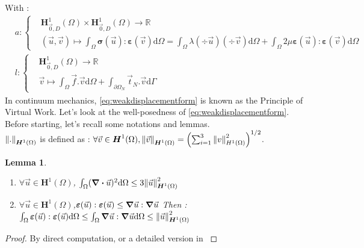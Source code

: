 \documentclass[a4paper,12pt,twoside]{report}
\newcommand{\mtr}{\mathbb{R}}
\newcommand{\dif}{\mathrm{d}}
\newtheorem{lemma}[theorem]{Lemma}
\begin{document}
With : 
\begin{equation*}
    \begin{aligned}
        & a : \left\{
        \begin{aligned}
            &\boldsymbol H^1_{\vec 0,D}(\Omega) \times \boldsymbol H^1_{\vec 0,D}(\Omega)  \rightarrow \mtr \\
            &(\vec u,\vec v)  \longmapsto \int_\Omega \boldsymbol \sigma(\vec u) : \boldsymbol \varepsilon (\vec v) \dif \Omega = \int_\Omega \lambda (\div \vec u) (\div \vec v) \dif \Omega+ \int_\Omega 2\mu \boldsymbol \varepsilon(\vec u): \boldsymbol \varepsilon (\vec v)\dif \Omega
        \end{aligned}
        \right. \\
    	& l : \left\{
        \begin{aligned}
            &\boldsymbol H^1_{\vec 0,D}(\Omega) \rightarrow \mtr \\
            &\vec v \longmapsto \int_\Omega \vec f . \vec v \dif \Omega + \int_{\partial\Omega_N} \vec t_N.\vec v \dif \Gamma
        \end{aligned}
        \right.
    \end{aligned}
\end{equation*}
In continuum mechanics, \eqref{eq:weakdisplacementform} is known as the Principle of Virtual Work. Let's look at the well-posedness of \eqref{eq:weakdisplacementform}. Before starting, let's recall some notations and lemmas. \\

$\norm{.}_{\boldsymbol H^1(\Omega)}$ is defined as : $\forall \vec v \in \boldsymbol H^1(\Omega), \norm{\vec v}_{\boldsymbol H^1(\Omega)} = \left(\sum_{i=1}^3 \norm{v}_{H^1(\Omega)}^2 \right)^{1/2}$. 
\begin{lemma}
\begin{enumerate}
    \item $\displaystyle \forall \vec u \in \boldsymbol H^1(\Omega)$, $\int_\Omega (\div \vec u)^2 \dif \Omega \leq 3 \norm{\vec u}_{\boldsymbol H^1(\Omega)}^2$
    \item $\displaystyle \forall \vec u \in \boldsymbol H^1(\Omega)$,$\boldsymbol \varepsilon(\vec u) : \boldsymbol \varepsilon(\vec u) \leq \grad \vec u : \grad \vec u$
    Then : $\int_\Omega \boldsymbol \varepsilon(\vec u) : \boldsymbol \varepsilon(\vec u) \dif\Omega \leq \int_\Omega \grad \vec u : \grad \vec u \dif \Omega \leq \norm{\vec u}_{\boldsymbol H^1(\Omega)}^2$
\end{enumerate}
\end{lemma}
\begin{proof}
    By direct computation, or a detailed version in \cite{cinatl_finite}
\end{proof}
\end{document}
